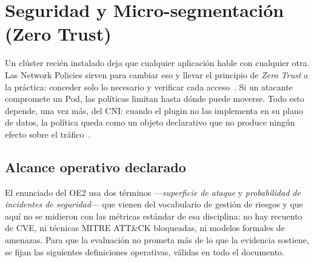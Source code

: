 \section{Seguridad y Micro-segmentación (Zero Trust)}

Un clúster recién instalado deja que cualquier aplicación hable con cualquier otra. Las Network Policies sirven para cambiar eso y llevar el principio de \emph{Zero Trust} a la práctica: conceder solo lo necesario y verificar cada acceso~\cite{ref24,ref25}. Si un atacante compromete un Pod, las políticas limitan hasta dónde puede moverse. Todo esto depende, una vez más, del CNI: cuando el plugin no las implementa en su plano de datos, la política queda como un objeto declarativo que no produce ningún efecto sobre el tráfico~\cite{ref4,ref18}.

\subsection{Alcance operativo declarado} \label{sec:apb2_alcance}

El enunciado del OE2 usa dos términos ---\emph{superficie de ataque} y \emph{probabilidad de incidentes de seguridad}--- que vienen del vocabulario de gestión de riesgos y que aquí no se midieron con las métricas estándar de esa disciplina: no hay recuento de CVE, ni técnicas MITRE ATT\&CK bloqueadas, ni modelos formales de amenazas. Para que la evaluación no prometa más de lo que la evidencia sostiene, se fijan las siguientes definiciones operativas, válidas en todo el documento.

